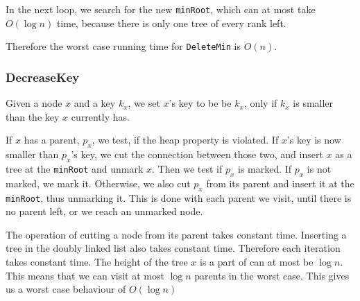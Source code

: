 \documentclass[a4paper,10pt]{article}
\begin{document}
In the next loop, we search for the new \texttt{minRoot}, which can at most take $O(\log n)$ time, because there is only one tree of every rank left.

Therefore the worst case running time for \texttt{DeleteMin} is $O(n)$.





\subsubsection*{DecreaseKey}
Given a node $x$ and a key $k_x$, we set $x$'s key to be be $k_x$, only if $k_x$ is smaller than the key $x$ currently has.

If $x$ has a parent, $p_x$, we test, if the heap property is violated. If $x$'s key is now smaller than $p_x$'s key, we cut the connection between those two, and insert $x$ as a tree at the \texttt{minRoot} and unmark $x$.
Then we test if $p_x$ is marked. If $p_x$ is not marked, we mark it. Otherwise, we also cut $p_x$ from its parent and insert it at the \texttt{minRoot}, thus unmarking it. This is done with each parent we visit, until there is no parent left, or we reach an unmarked node.

The operation of cutting a node from its parent takes constant time. Inserting a tree in the doubly linked list also takes constant time. Therefore each iteration takes constant time. The height of the tree $x$ is a part of can at most be $\log n$. This means that we can visit at most $\log n$ parents in the worst case. This gives us a worst case behaviour of $O(\log n)$
\end{document}
